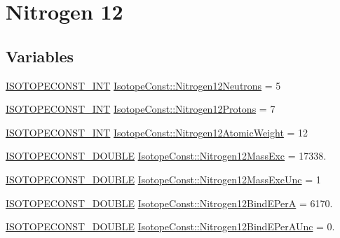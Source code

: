 \hypertarget{group___isotope_const-_nitrogen-_n12}{}\section{Nitrogen 12}
\label{group___isotope_const-_nitrogen-_n12}
\subsection*{Variables}
\begin{DoxyCompactItemize}
\item 
\mbox{\hyperlink{group___isotope_const-_macros_ga5f18360b3e99483a35c32d789e62621c}{I\+S\+O\+T\+O\+P\+E\+C\+O\+N\+S\+T\+\_\+\+I\+NT}} \mbox{\hyperlink{group___isotope_const-_nitrogen-_n12_ga7821defadc3cde53132e710d1663ec83}{Isotope\+Const\+::\+Nitrogen12\+Neutrons}} = 5
\item 
\mbox{\hyperlink{group___isotope_const-_macros_ga5f18360b3e99483a35c32d789e62621c}{I\+S\+O\+T\+O\+P\+E\+C\+O\+N\+S\+T\+\_\+\+I\+NT}} \mbox{\hyperlink{group___isotope_const-_nitrogen-_n12_ga7d3a169c50c69fe4e6f7eb248341a14e}{Isotope\+Const\+::\+Nitrogen12\+Protons}} = 7
\item 
\mbox{\hyperlink{group___isotope_const-_macros_ga5f18360b3e99483a35c32d789e62621c}{I\+S\+O\+T\+O\+P\+E\+C\+O\+N\+S\+T\+\_\+\+I\+NT}} \mbox{\hyperlink{group___isotope_const-_nitrogen-_n12_ga14b05af2e3de8e3cfcf6b4a8e09b02b7}{Isotope\+Const\+::\+Nitrogen12\+Atomic\+Weight}} = 12
\item 
\mbox{\hyperlink{group___isotope_const-_macros_ga8f45a7272ce02c0b4c65c44636ed719a}{I\+S\+O\+T\+O\+P\+E\+C\+O\+N\+S\+T\+\_\+\+D\+O\+U\+B\+LE}} \mbox{\hyperlink{group___isotope_const-_nitrogen-_n12_gacc38fd8c47aa8a0686dff65b7754a74e}{Isotope\+Const\+::\+Nitrogen12\+Mass\+Exc}} = 17338.
\item 
\mbox{\hyperlink{group___isotope_const-_macros_ga8f45a7272ce02c0b4c65c44636ed719a}{I\+S\+O\+T\+O\+P\+E\+C\+O\+N\+S\+T\+\_\+\+D\+O\+U\+B\+LE}} \mbox{\hyperlink{group___isotope_const-_nitrogen-_n12_ga2586728a5c52800aa60a7fc0d539ca75}{Isotope\+Const\+::\+Nitrogen12\+Mass\+Exc\+Unc}} = 1
\item 
\mbox{\hyperlink{group___isotope_const-_macros_ga8f45a7272ce02c0b4c65c44636ed719a}{I\+S\+O\+T\+O\+P\+E\+C\+O\+N\+S\+T\+\_\+\+D\+O\+U\+B\+LE}} \mbox{\hyperlink{group___isotope_const-_nitrogen-_n12_ga4cdfbb8a7827f80b334cfa5227915bc8}{Isotope\+Const\+::\+Nitrogen12\+Bind\+E\+PerA}} = 6170.
\item 
\mbox{\hyperlink{group___isotope_const-_macros_ga8f45a7272ce02c0b4c65c44636ed719a}{I\+S\+O\+T\+O\+P\+E\+C\+O\+N\+S\+T\+\_\+\+D\+O\+U\+B\+LE}} \mbox{\hyperlink{group___isotope_const-_nitrogen-_n12_gaec74b0aeae91b26ca89f8242b1e99277}{Isotope\+Const\+::\+Nitrogen12\+Bind\+E\+Per\+A\+Unc}} = 0.

\end{DoxyCompactItemize}
